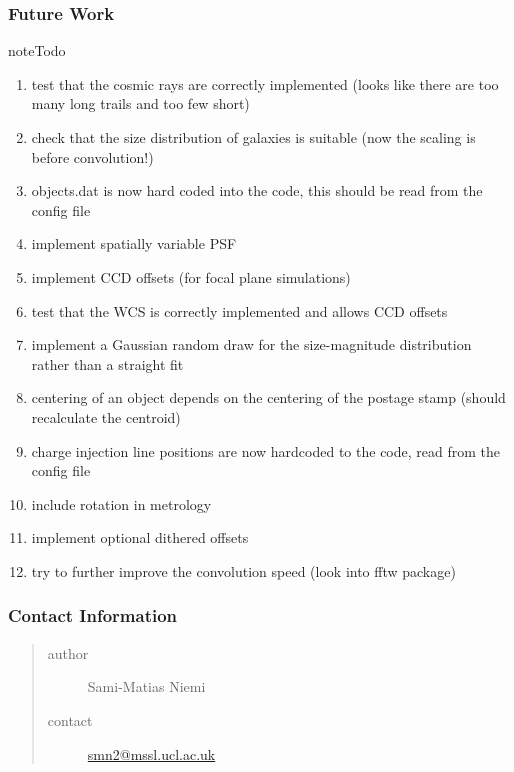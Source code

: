 \documentclass[a4paper,12pt,english]{sphinxmanual}
\begin{document}
\subsubsection{Future Work}
\label{simulator:future-work}
\begin{notice}{note}{Todo}
\begin{enumerate}
\item {} 
test that the cosmic rays are correctly implemented (looks like there are too many long trails and too few short)

\item {} 
check that the size distribution of galaxies is suitable (now the scaling is before convolution!)

\item {} 
objects.dat is now hard coded into the code, this should be read from the config file

\item {} 
implement spatially variable PSF

\item {} 
implement CCD offsets (for focal plane simulations)

\item {} 
test that the WCS is correctly implemented and allows CCD offsets

\item {} 
implement a Gaussian random draw for the size-magnitude distribution rather than a straight fit

\item {} 
centering of an object depends on the centering of the postage stamp (should recalculate the centroid)

\item {} 
charge injection line positions are now hardcoded to the code, read from the config file

\item {} 
include rotation in metrology

\item {} 
implement optional dithered offsets

\item {} 
try to further improve the convolution speed (look into fftw package)

\end{enumerate}
\end{notice}


\subsubsection{Contact Information}
\label{simulator:contact-information}\begin{quote}\begin{description}
\item[{author}] \leavevmode
Sami-Matias Niemi

\item[{contact}] \leavevmode
\href{mailto:smn2@mssl.ucl.ac.uk}{smn2@mssl.ucl.ac.uk}

\end{description}\end{quote}
\end{document}
